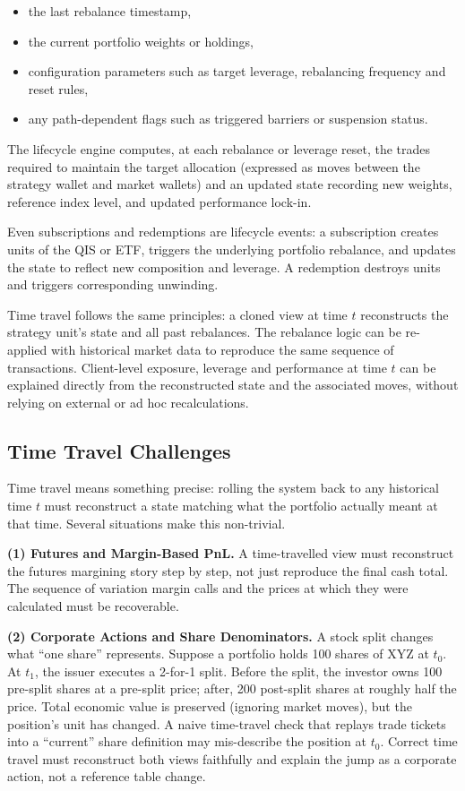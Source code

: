 \documentclass[11pt,a4paper]{article}
\begin{document}
\begin{itemize}[nosep]
\item the last rebalance timestamp,
\item the current portfolio weights or holdings,
\item configuration parameters such as target leverage, rebalancing frequency and reset rules,
\item any path-dependent flags such as triggered barriers or suspension status.
\end{itemize}

The lifecycle engine computes, at each rebalance or leverage reset, the trades required to maintain the target allocation (expressed as moves between the strategy wallet and market wallets) and an updated state recording new weights, reference index level, and updated performance lock-in.

Even subscriptions and redemptions are lifecycle events: a subscription creates units of the QIS or ETF, triggers the underlying portfolio rebalance, and updates the state to reflect new composition and leverage. A redemption destroys units and triggers corresponding unwinding.

Time travel follows the same principles: a cloned view at time $t$ reconstructs the strategy unit's state and all past rebalances. The rebalance logic can be re-applied with historical market data to reproduce the same sequence of transactions. Client-level exposure, leverage and performance at time $t$ can be explained directly from the reconstructed state and the associated moves, without relying on external or ad hoc recalculations.

\subsection{Time Travel Challenges}

Time travel means something precise: rolling the system back to any historical time $t$ must reconstruct a state matching what the portfolio actually meant at that time. Several situations make this non-trivial.

\noindent\textbf{(1) Futures and Margin-Based PnL.} A time-travelled view must reconstruct the futures margining story step by step, not just reproduce the final cash total. The sequence of variation margin calls and the prices at which they were calculated must be recoverable.

\noindent\textbf{(2) Corporate Actions and Share Denominators.} A stock split changes what ``one share'' represents. Suppose a portfolio holds 100 shares of XYZ at $t_0$. At $t_1$, the issuer executes a 2-for-1 split. Before the split, the investor owns 100 pre-split shares at a pre-split price; after, 200 post-split shares at roughly half the price. Total economic value is preserved (ignoring market moves), but the position's unit has changed. A naive time-travel check that replays trade tickets into a ``current'' share definition may mis-describe the position at $t_0$. Correct time travel must reconstruct both views faithfully and explain the jump as a corporate action, not a reference table change.
\end{document}

